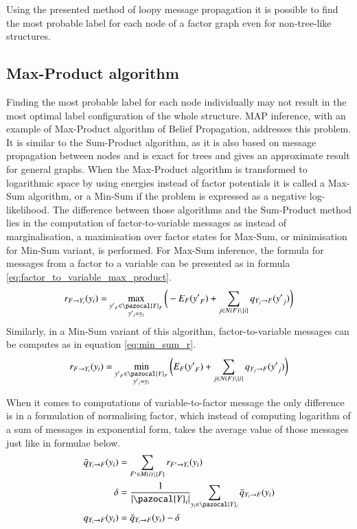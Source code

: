 Using the presented method of loopy message propagation it is possible to find the most probable label for each node of a factor graph even for non-tree-like structures. 

\subsection{Max-Product algorithm }

Finding the most probable label for each node individually may not result in the most optimal label configuration of the whole structure. MAP inference, with an example of Max-Product algorithm of Belief Propagation, addresses this problem. It is similar to the Sum-Product algorithm, as it is also based on message propagation between nodes and is exact for trees and gives an approximate result for general graphs. When the Max-Product algorithm is transformed to logarithmic space by using energies instead of factor potentials it is called a Max-Sum algorithm, or a Min-Sum if the problem is expressed as a negative log-likelihood. The difference between those algorithms and the Sum-Product method lies in the computation of factor-to-variable messages as instead of marginalisation, a maximisation over factor states for Max-Sum, or minimisation for Min-Sum variant, is performed. For Max-Sum inference, the formula for messages from a factor to a variable can be presented as in formula \ref{eq:factor_to_variable_max_product}.
\begin{equation}
    \label{eq:factor_to_variable_max_product}
   r_{F \rightarrow Y_i}(y_i) = 
       \max_{\substack{{y'}_{F}\in \pazocal{Y}_F                               \\ {y'}_i = y_i}}
       {\bigg(-E_F({y'}_F) + \sum_{j \in N (F) \setminus \left \{ i \right \}}
            {q_{Y_j\rightarrow F}({y'}_j)}\bigg)}
\end{equation}
Similarly, in a Min-Sum variant of this algorithm, factor-to-variable messages can be computes as in equation \ref{eq:min_sum_r}.
\begin{equation}
    \label{eq:min_sum_r}
   r_{F \rightarrow Y_i}(y_i) = 
       \min_{\substack{{y'}_{F}\in \pazocal{Y}_F                               \\ {y'}_i = y_i}}
       {\bigg(E_F({y'}_F) + \sum_{j \in N (F) \setminus \left \{ i \right \}}
            {q_{Y_j\rightarrow F}({y'}_j)}\bigg)}
\end{equation}

When it comes to computations of variable-to-factor message the only difference is in a formulation of normalising factor, which instead of computing logarithm of a sum of messages in exponential form, takes the average value of those messages just like in formulae below.
\begin{align}
    \bar{q}_{Y_i\rightarrow F}(y_i) &= \sum_{F' \in M(i) \setminus \left \{ F \right \} }{ r_{F' \rightarrow Y_i}(y_i)} \\
    \delta &= \frac{1}{\left |\pazocal{Y}_i \right |}{\sum_{y_i \in \pazocal{Y}_i}{\bar{q}_{Y_i\rightarrow F}(y_i)}} \\
    q_{Y_i\rightarrow F}(y_i) &= \bar{q}_{Y_i\rightarrow F}(y_i) - \delta
\end{align}

